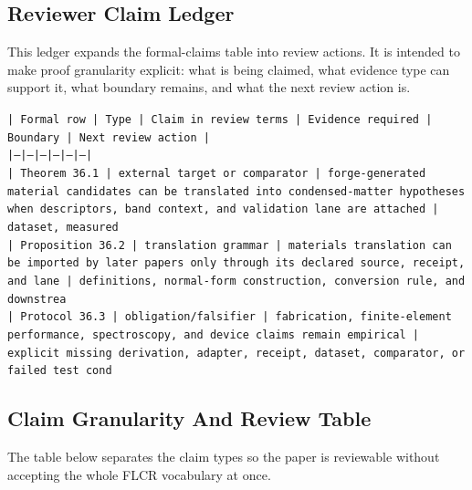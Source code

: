 \documentclass[11pt]{article}
\begin{document}
\subsection*{Reviewer Claim Ledger}

This ledger expands the formal-claims table into review actions. It is intended to make proof granularity explicit: what is being claimed, what evidence type can support it, what boundary remains, and what the next review action is.

\noindent\texttt{| Formal row | Type | Claim in review terms | Evidence required | Boundary | Next review action |}\\
\noindent\texttt{|---|---|---|---|---|---|}\\
\noindent\texttt{| Theorem 36.1 | external target or comparator | forge-generated material candidates can be translated into condensed-matter hypotheses when descriptors, band context, and validation lane are attached | dataset, measured}\\
\noindent\texttt{| Proposition 36.2 | translation grammar | materials translation can be imported by later papers only through its declared source, receipt, and lane | definitions, normal-form construction, conversion rule, and downstrea}\\
\noindent\texttt{| Protocol 36.3 | obligation/falsifier | fabrication, finite-element performance, spectroscopy, and device claims remain empirical | explicit missing derivation, adapter, receipt, dataset, comparator, or failed test cond}\\

\subsection*{Claim Granularity And Review Table}

The table below separates the claim types so the paper is reviewable without accepting the whole FLCR vocabulary at once.
\end{document}
